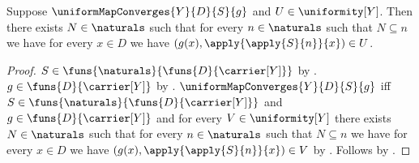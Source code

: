 \begin{proposition}\label{uniform_map_convergence_entourage}
    Suppose $\uniformMapConverges{Y}{D}{S}{g}$ and $U\in\uniformity[Y]$.
    Then there exists $N\in\naturals$ such that for every
        $n\in\naturals$ such that $N\subseteq n$ we have for every
        $x\in D$ we have $(g(x),\apply{\apply{S}{n}}{x})\in U$.
\end{proposition}
\begin{proof}
    $S\in\funs{\naturals}{\funs{D}{\carrier[Y]}}$ by
        .
    $g\in\funs{D}{\carrier[Y]}$ by
        .
    $\uniformMapConverges{Y}{D}{S}{g}$ iff
        $S\in\funs{\naturals}{\funs{D}{\carrier[Y]}}$ and
        $g\in\funs{D}{\carrier[Y]}$ and for every $V\in\uniformity[Y]$
        there exists $N\in\naturals$ such that for every $n\in\naturals$
        such that $N\subseteq n$ we have for every $x\in D$ we have
            $(g(x),\apply{\apply{S}{n}}{x})\in V$ by
        .
    Follows by \auto.
\end{proof}

